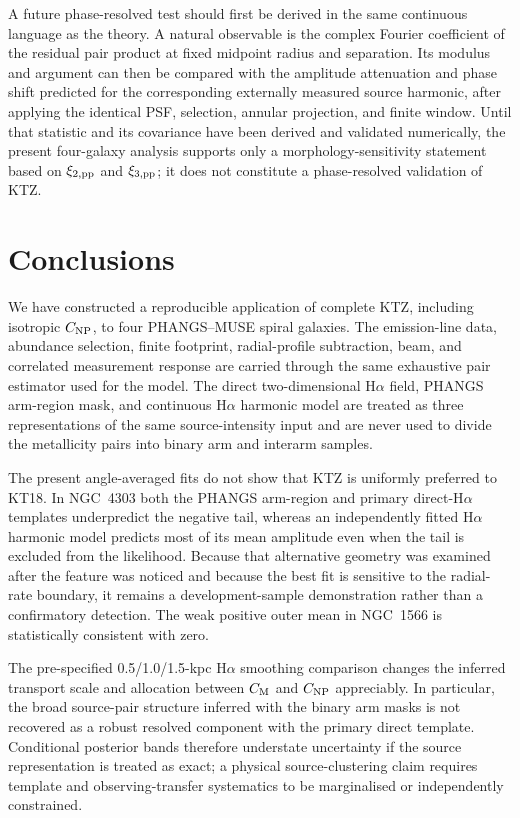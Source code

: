 \documentclass[fleqn,usenatbib]{mnras}
\begin{document}
A future phase-resolved test should first be derived in the same continuous language as the theory.  A natural observable is the complex Fourier coefficient of the residual pair product at fixed midpoint radius and separation.  Its modulus and argument can then be compared with the amplitude attenuation and phase shift predicted for the corresponding externally measured source harmonic, after applying the identical PSF, selection, annular projection, and finite window.  Until that statistic and its covariance have been derived and validated numerically, the present four-galaxy analysis supports only a morphology-sensitivity statement based on $\xi_{2,{\rm pp}}$ and $\xi_{3,{\rm pp}}$; it does not constitute a phase-resolved validation of KTZ.

\section{Conclusions}

We have constructed a reproducible application of complete KTZ, including isotropic $C_{\rm NP}$, to four PHANGS--MUSE spiral galaxies.  The emission-line data, abundance selection, finite footprint, radial-profile subtraction, beam, and correlated measurement response are carried through the same exhaustive pair estimator used for the model.  The direct two-dimensional H$\alpha$ field, PHANGS arm-region mask, and continuous H$\alpha$ harmonic model are treated as three representations of the same source-intensity input and are never used to divide the metallicity pairs into binary arm and interarm samples.

The present angle-averaged fits do not show that KTZ is uniformly preferred to KT18.  In NGC~4303 both the PHANGS arm-region and primary direct-H$\alpha$ templates underpredict the negative tail, whereas an independently fitted H$\alpha$ harmonic model predicts most of its mean amplitude even when the tail is excluded from the likelihood.  Because that alternative geometry was examined after the feature was noticed and because the best fit is sensitive to the radial-rate boundary, it remains a development-sample demonstration rather than a confirmatory detection.  The weak positive outer mean in NGC~1566 is statistically consistent with zero.

The pre-specified 0.5/1.0/1.5-kpc H$\alpha$ smoothing comparison changes the inferred transport scale and allocation between $C_{\rm M}$ and $C_{\rm NP}$ appreciably.  In particular, the broad source-pair structure inferred with the binary arm masks is not recovered as a robust resolved component with the primary direct template.  Conditional posterior bands therefore understate uncertainty if the source representation is treated as exact; a physical source-clustering claim requires template and observing-transfer systematics to be marginalised or independently constrained.
\end{document}
